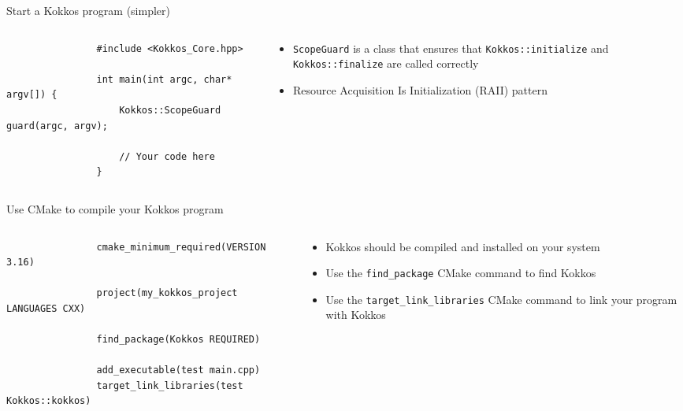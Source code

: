 \documentclass[aspectratio=169]{beamer}
\begin{document}

\begin{frame}[fragile]{Start a Kokkos program (simpler)}
    \begin{columns}
        \begin{column}{0.6\linewidth}
            \begin{verbatim}
                #include <Kokkos_Core.hpp>

                int main(int argc, char* argv[]) {
                    Kokkos::ScopeGuard guard(argc, argv);

                    // Your code here
                }
            \end{verbatim}
        \end{column}
        \begin{column}{0.4\linewidth}
            \begin{itemize}
                \item \texttt{ScopeGuard} is a class that ensures that \texttt{Kokkos::initialize} and \texttt{Kokkos::finalize} are called correctly
                \item Resource Acquisition Is Initialization (RAII) pattern
            \end{itemize}
        \end{column}
    \end{columns}
\end{frame}


\begin{frame}[fragile]{Use CMake to compile your Kokkos program}
    \begin{columns}
        \begin{column}{0.6\linewidth}
            \begin{verbatim}
                cmake_minimum_required(VERSION 3.16)

                project(my_kokkos_project LANGUAGES CXX)

                find_package(Kokkos REQUIRED)

                add_executable(test main.cpp)
                target_link_libraries(test Kokkos::kokkos)
            \end{verbatim}
        \end{column}
        \begin{column}{0.4\linewidth}
            \begin{itemize}
                \item Kokkos should be compiled and installed on your system
                \item Use the \texttt{find\_package} CMake command to find Kokkos
                \item Use the \texttt{target\_link\_libraries} CMake command to link your program with Kokkos
            \end{itemize}
        \end{column}
    \end{columns}
\end{frame}
\end{document}
